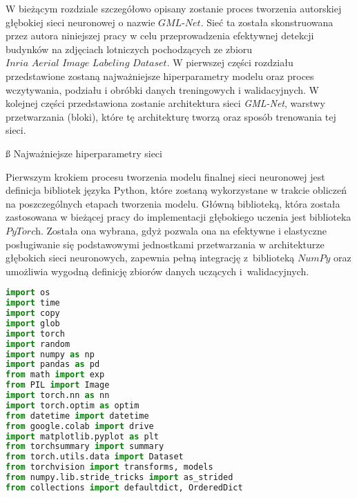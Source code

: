  

\cell
W bieżącym rozdziale szczegółowo opisany zostanie proces tworzenia autorskiej głębokiej sieci neuronowej o nazwie $\textit{GML-Net}$. Sieć ta została skonstruowana przez autora niniejszej pracy w celu przeprowadzenia efektywnej detekcji budynków na zdjęciach lotniczych pochodzących ze zbioru $\textit{Inria Aerial Image Labeling Dataset}$. W pierwszej części rozdziału przedstawione zostaną najważniejsze hiperparametry modelu oraz proces wczytywania, podziału i obróbki danych treningowych i walidacyjnych. W kolejnej części przedstawiona zostanie architektura sieci \textit{GML-Net}, warstwy przetwarzania (bloki), które tę architekturę tworzą oraz sposób trenowania tej sieci.

\vspace{-0.5cm}
\cell
\ss{ Najważniejsze hiperparametry sieci}

\cell
Pierwszym krokiem procesu tworzenia modelu finalnej sieci neuronowej jest definicja bibliotek języka Python, które zostaną wykorzystane w trakcie obliczeń na poszczególnych etapach tworzenia modelu. Główną biblioteką, która została zastosowana w bieżącej pracy do implementacji głębokiego uczenia jest biblioteka $\textit{PyTorch}$. Została ona wybrana, gdyż pozwala ona na efektywne i elastyczne posługiwanie się podstawowymi jednostkami przetwarzania w architekturze głębokich sieci neuronowych, zapewnia pełną integrację z~biblioteką $\textit{NumPy}$ oraz umożliwia wygodną definicję zbiorów danych uczących i~walidacyjnych.
\vspace{0.5cm}

\cell
\begin{lstlisting}[name=Rozdzial3.1, language=Python]
import os
import time
import copy
import glob
import torch
import random
import numpy as np
import pandas as pd
from math import exp
from PIL import Image
import torch.nn as nn
import torch.optim as optim
from datetime import datetime
from google.colab import drive
import matplotlib.pyplot as plt
from torchsummary import summary
from torch.utils.data import Dataset
from torchvision import transforms, models
from numpy.lib.stride_tricks import as_strided
from collections import defaultdict, OrderedDict
\end{lstlisting}


